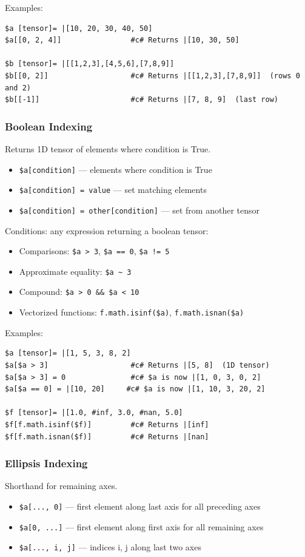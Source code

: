 Examples:
\begin{verbatim}
$a [tensor]= |[10, 20, 30, 40, 50]
$a[[0, 2, 4]]                #c# Returns |[10, 30, 50]

$b [tensor]= |[[1,2,3],[4,5,6],[7,8,9]]
$b[[0, 2]]                   #c# Returns |[[1,2,3],[7,8,9]]  (rows 0 and 2)
$b[[-1]]                     #c# Returns |[7, 8, 9]  (last row)
\end{verbatim}

\subsubsection{Boolean Indexing}
Returns 1D tensor of elements where condition is True.
\begin{itemize}
\item \texttt{\$a[condition]} --- elements where condition is True
\item \texttt{\$a[condition] = value} --- set matching elements
\item \texttt{\$a[condition] = other[condition]} --- set from another tensor
\end{itemize}

Conditions: any expression returning a boolean tensor:
\begin{itemize}
\item Comparisons: \texttt{\$a > 3}, \texttt{\$a == 0}, \texttt{\$a != 5}
\item Approximate equality: \texttt{\$a \textasciitilde{} 3}
\item Compound: \texttt{\$a > 0 \&\& \$a < 10}
\item Vectorized functions: \texttt{f.math.isinf(\$a)}, \texttt{f.math.isnan(\$a)}
\end{itemize}

Examples:
\begin{verbatim}
$a [tensor]= |[1, 5, 3, 8, 2]
$a[$a > 3]                   #c# Returns |[5, 8]  (1D tensor)
$a[$a > 3] = 0               #c# $a is now |[1, 0, 3, 0, 2]
$a[$a == 0] = |[10, 20]     #c# $a is now |[1, 10, 3, 20, 2]

$f [tensor]= |[1.0, #inf, 3.0, #nan, 5.0]
$f[f.math.isinf($f)]         #c# Returns |[inf]
$f[f.math.isnan($f)]         #c# Returns |[nan]
\end{verbatim}

\subsubsection{Ellipsis Indexing}
Shorthand for remaining axes.
\begin{itemize}
\item \texttt{\$a[..., 0]} --- first element along last axis for all preceding axes
\item \texttt{\$a[0, ...]} --- first element along first axis for all remaining axes
\item \texttt{\$a[..., i, j]} --- indices i, j along last two axes
\end{itemize}

